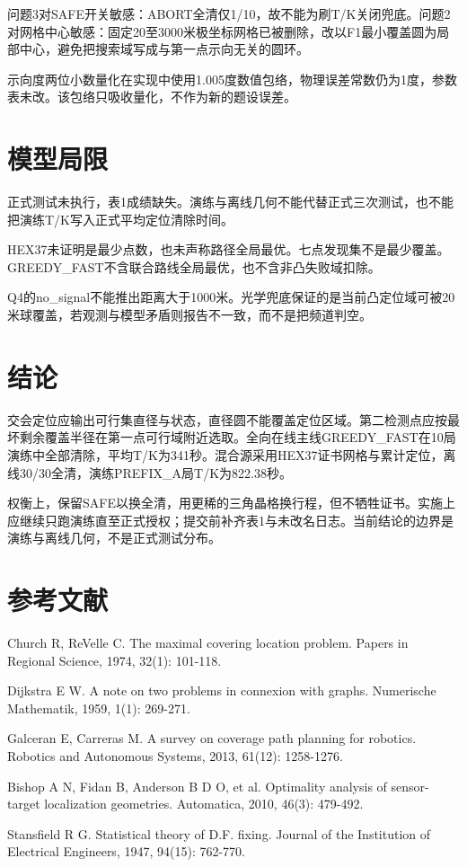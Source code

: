 \documentclass[UTF8,12pt,a4paper,fontset=none]{ctexart}
\begin{document}
问题3对SAFE开关敏感：ABORT全清仅1/10，故不能为刷T/K关闭兜底。问题2对网格中心敏感：固定20至3000米极坐标网格已被删除，改以F1最小覆盖圆为局部中心，避免把搜索域写成与第一点示向无关的圆环。

示向度两位小数量化在实现中使用1.005度数值包络，物理误差常数仍为1度，参数表未改。该包络只吸收量化，不作为新的题设误差。

\section{模型局限}

正式测试未执行，表1成绩缺失。演练与离线几何不能代替正式三次测试，也不能把演练T/K写入正式平均定位清除时间。

HEX37未证明是最少点数，也未声称路径全局最优。七点发现集不是最少覆盖。GREEDY\_FAST不含联合路线全局最优，也不含非凸失败域扣除。

Q4的no\_signal不能推出距离大于1000米。光学兜底保证的是当前凸定位域可被20米球覆盖，若观测与模型矛盾则报告不一致，而不是把频道判空。

\section{结论}

交会定位应输出可行集直径与状态，直径圆不能覆盖定位区域。第二检测点应按最坏剩余覆盖半径在第一点可行域附近选取。全向在线主线GREEDY\_FAST在10局演练中全部清除，平均T/K为341秒。混合源采用HEX37证书网格与累计定位，离线30/30全清，演练PREFIX\_A局T/K为822.38秒。

权衡上，保留SAFE以换全清，用更稀的三角晶格换行程，但不牺牲证书。实施上应继续只跑演练直至正式授权；提交前补齐表1与未改名日志。当前结论的边界是演练与离线几何，不是正式测试分布。

\label{mcm:main-body-end}

\clearpage
\section*{参考文献}
\begin{enumerate}[label={[\arabic*]},leftmargin=*,itemsep=0.5em]
  \item Church R, ReVelle C. The maximal covering location problem. Papers in Regional Science, 1974, 32(1): 101-118.
  \item Dijkstra E W. A note on two problems in connexion with graphs. Numerische Mathematik, 1959, 1(1): 269-271.
  \item Galceran E, Carreras M. A survey on coverage path planning for robotics. Robotics and Autonomous Systems, 2013, 61(12): 1258-1276.
  \item Bishop A N, Fidan B, Anderson B D O, et al. Optimality analysis of sensor-target localization geometries. Automatica, 2010, 46(3): 479-492.
  \item Stansfield R G. Statistical theory of D.F. fixing. Journal of the Institution of Electrical Engineers, 1947, 94(15): 762-770.
\end{enumerate}
\end{document}
